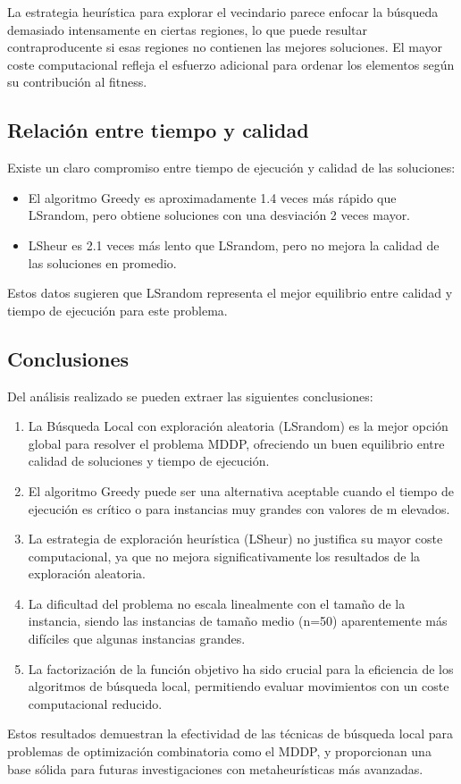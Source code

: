 \documentclass{article}
\begin{document}
La estrategia heurística para explorar el vecindario parece enfocar la búsqueda demasiado intensamente en ciertas regiones, lo que puede resultar contraproducente si esas regiones no contienen las mejores soluciones. El mayor coste computacional refleja el esfuerzo adicional para ordenar los elementos según su contribución al fitness.

\subsection{Relación entre tiempo y calidad}

Existe un claro compromiso entre tiempo de ejecución y calidad de las soluciones:

\begin{itemize}
    \item El algoritmo Greedy es aproximadamente 1.4 veces más rápido que LSrandom, pero obtiene soluciones con una desviación 2 veces mayor.
    \item LSheur es 2.1 veces más lento que LSrandom, pero no mejora la calidad de las soluciones en promedio.
\end{itemize}

Estos datos sugieren que LSrandom representa el mejor equilibrio entre calidad y tiempo de ejecución para este problema.

\subsection{Conclusiones}

Del análisis realizado se pueden extraer las siguientes conclusiones:

\begin{enumerate}
    \item La Búsqueda Local con exploración aleatoria (LSrandom) es la mejor opción global para resolver el problema MDDP, ofreciendo un buen equilibrio entre calidad de soluciones y tiempo de ejecución.
    
    \item El algoritmo Greedy puede ser una alternativa aceptable cuando el tiempo de ejecución es crítico o para instancias muy grandes con valores de m elevados.
    
    \item La estrategia de exploración heurística (LSheur) no justifica su mayor coste computacional, ya que no mejora significativamente los resultados de la exploración aleatoria.
    
    \item La dificultad del problema no escala linealmente con el tamaño de la instancia, siendo las instancias de tamaño medio (n=50) aparentemente más difíciles que algunas instancias grandes.
    
    \item La factorización de la función objetivo ha sido crucial para la eficiencia de los algoritmos de búsqueda local, permitiendo evaluar movimientos con un coste computacional reducido.
\end{enumerate}

Estos resultados demuestran la efectividad de las técnicas de búsqueda local para problemas de optimización combinatoria como el MDDP, y proporcionan una base sólida para futuras investigaciones con metaheurísticas más avanzadas.
\end{document}
